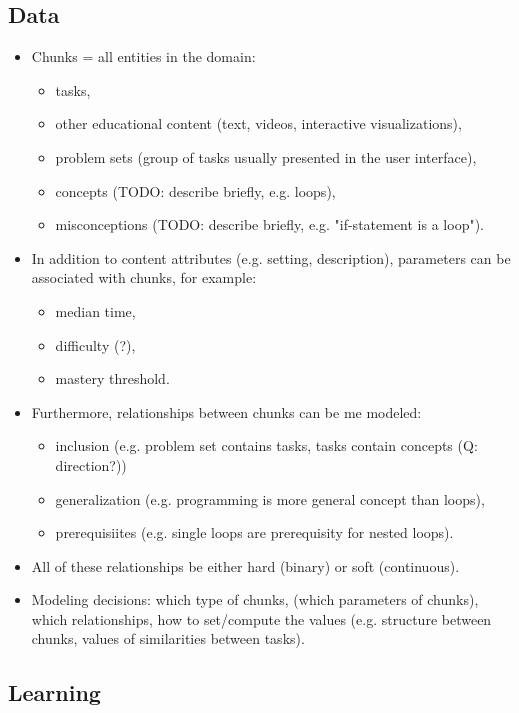 \subsection{Data}  %

\begin{itemize}
\item Chunks = all entities in the domain:
\begin{itemize}
\item tasks,
\item other educational content (text, videos, interactive visualizations),
\item problem sets (group of tasks usually presented in the user interface),
\item concepts (TODO: describe briefly, e.g. loops),
\item misconceptions (TODO: describe briefly, e.g. "if-statement is a loop").
\end{itemize}
\item In addition to content attributes (e.g. setting, description),
    parameters can be associated with chunks, for example:
\begin{itemize}
\item median time,
\item difficulty (?),
\item mastery threshold.
\end{itemize}
\item Furthermore, relationships between chunks can be me modeled:
\begin{itemize}
\item inclusion (e.g. problem set contains tasks, tasks contain concepts (Q: direction?))
\item generalization (e.g. programming is more general concept than loops),
\item prerequisiites (e.g. single loops are prerequisity for nested loops).
\end{itemize}
\item All of these relationships be either hard (binary) or soft (continuous).
\item Modeling decisions: which type of chunks, (which parameters of chunks),
  which relationships, how to set/compute the values (e.g. structure between
  chunks, values of similarities between tasks).
\end{itemize}

\subsection{Learning}

